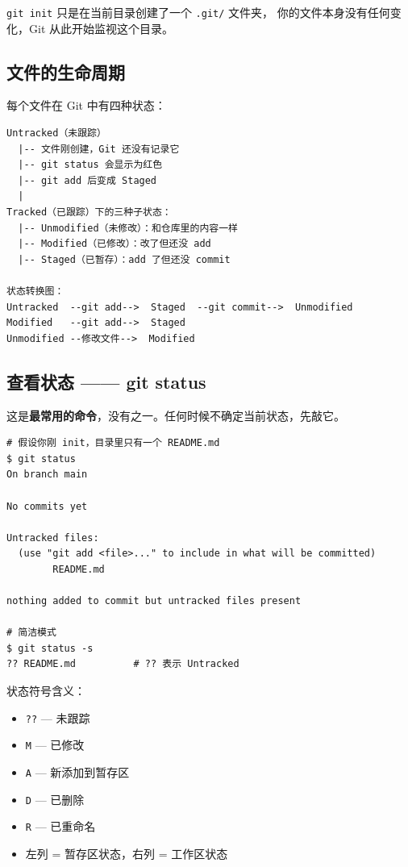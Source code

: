 \documentclass[12pt,a4paper]{article}
\begin{document}
\texttt{git init} 只是在当前目录创建了一个 \texttt{.git/} 文件夹，
你的文件本身没有任何变化，Git 从此开始监视这个目录。

\subsection{文件的生命周期}

每个文件在 Git 中有四种状态：

\begin{lstlisting}[numbers=none]
Untracked（未跟踪）
  |-- 文件刚创建，Git 还没有记录它
  |-- git status 会显示为红色
  |-- git add 后变成 Staged
  |
Tracked（已跟踪）下的三种子状态：
  |-- Unmodified（未修改）：和仓库里的内容一样
  |-- Modified（已修改）：改了但还没 add
  |-- Staged（已暂存）：add 了但还没 commit

状态转换图：
Untracked  --git add-->  Staged  --git commit-->  Unmodified
Modified   --git add-->  Staged
Unmodified --修改文件-->  Modified
\end{lstlisting}

\subsection{查看状态 —— git status}

这是\textbf{最常用的命令}，没有之一。任何时候不确定当前状态，先敲它。

\begin{lstlisting}
# 假设你刚 init，目录里只有一个 README.md
$ git status
On branch main

No commits yet

Untracked files:
  (use "git add <file>..." to include in what will be committed)
        README.md

nothing added to commit but untracked files present

# 简洁模式
$ git status -s
?? README.md          # ?? 表示 Untracked
\end{lstlisting}

状态符号含义：
\begin{itemize}[itemsep=3pt]
    \item \texttt{??} — 未跟踪
    \item \texttt{M} — 已修改
    \item \texttt{A} — 新添加到暂存区
    \item \texttt{D} — 已删除
    \item \texttt{R} — 已重命名
    \item 左列 = 暂存区状态，右列 = 工作区状态
\end{itemize}
\end{document}
